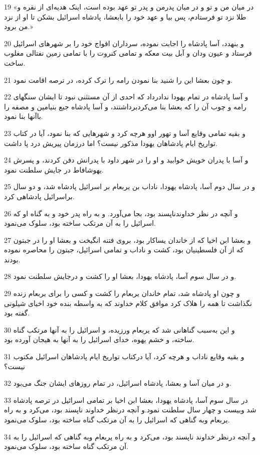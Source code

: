 \par 19 «در میان من و تو و در میان پدرمن و پدر تو عهد بوده است، اینک هدیه‌ای از نقره و طلا نزد تو فرستادم، پس بیا و عهد خود را بابعشا، پادشاه اسرائیل بشکن تا او از نزد من برود.»
\par 20 و بنهدد، آسا پادشاه را اجابت نموده، سرداران افواج خود را بر شهرهای اسرائیل فرستاد و عیون ودان و آبل بیت معکه و تمامی کنروت را با تمامی زمین نفتالی مغلوب ساخت.
\par 21 و چون بعشا این را شنید بنا نمودن رامه را ترک کرده، در ترصه اقامت نمود.
\par 22 و آسا پادشاه در تمام یهودا ندادرداد که احدی از آن مستثنی نبود تا ایشان سنگهای رامه و چوب آن را که بعشا بنا می‌کردبرداشتند، و آسا پادشاه جبع بنیامین و مصفه را باآنها بنا نمود.
\par 23 و بقیه تمامی وقایع آسا و تهور اوو هرچه کرد و شهرهایی که بنا نمود، آیا در کتاب تواریخ ایام پادشاهان یهودا مذکور نیست؟ اما درزمان پیریش درد پا داشت.
\par 24 و آسا با پدران خویش خوابید و او را در شهر داود با پدرانش دفن کردند، و پسرش یهوشافاط در جایش سلطنت نمود.
\par 25 و در سال دوم آسا، پادشاه یهودا، ناداب بن یربعام بر اسرائیل پادشاه شد، و دو سال براسرائیل پادشاهی کرد.
\par 26 و آنچه در نظر خداوندناپسند بود، بجا می‌آورد. و به راه پدر خود و به گناه او که اسرائیل را به آن مرتکب ساخته بود، سلوک می‌نمود.
\par 27 و بعشا ابن اخیا که از خاندان یساکار بود، بروی فتنه انگیخت و بعشا او را در جبتون که از آن فلسطینیان بود، کشت و ناداب و تمامی اسرائیل، جبتون را محاصره نموده بودند.
\par 28 و در سال سوم آسا، پادشاه یهودا، بعشا او را کشت و درجایش سلطنت نمود.
\par 29 و چون او پادشاه شد، تمام خاندان یربعام را کشت و کسی را برای یربعام زنده نگذاشت تا همه را هلاک کرد موافق کلام خداوند که به واسطه بنده خود اخیای شیلونی گفته بود.
\par 30 و این به‌سبب گناهانی شد که یربعام ورزیده، و اسرائیل را به آنها مرتکب گناه ساخته، و خشم یهوه، خدای اسرائیل را به آنها به هیجان آورده بود.
\par 31 و بقیه وقایع ناداب و هرچه کرد، آیا درکتاب تواریخ ایام پادشاهان اسرائیل مکتوب نیست؟
\par 32 و در میان آسا و بعشا، پادشاه اسرائیل، در تمام روزهای ایشان جنگ می‌بود.
\par 33 در سال سوم آسا، پادشاه یهودا، بعشا ابن اخیا بر تمامی اسرائیل در ترصه پادشاه شد وبیست و چهار سال سلطنت نمود.و آنچه درنظر خداوند ناپسند بود، می‌کرد و به راه یربعام وبه گناهی که اسرائیل را به آن مرتکب گناه ساخته بود، سلوک می‌نمود.
\par 34 و آنچه درنظر خداوند ناپسند بود، می‌کرد و به راه یربعام وبه گناهی که اسرائیل را به آن مرتکب گناه ساخته بود، سلوک می‌نمود.
 
